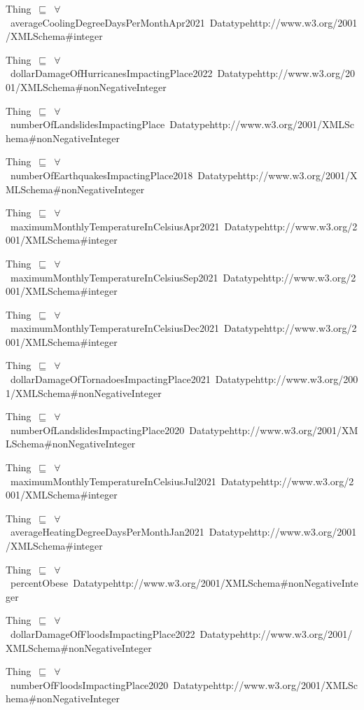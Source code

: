 \documentclass{article}
\begin{document}
Thing~\ensuremath{\sqsubseteq}~\ensuremath{\forall}~averageCoolingDegreeDaysPerMonthApr2021~Datatypehttp://www.w3.org/2001/XMLSchema#integer~

Thing~\ensuremath{\sqsubseteq}~\ensuremath{\forall}~dollarDamageOfHurricanesImpactingPlace2022~Datatypehttp://www.w3.org/2001/XMLSchema#nonNegativeInteger~

Thing~\ensuremath{\sqsubseteq}~\ensuremath{\forall}~numberOfLandslidesImpactingPlace~Datatypehttp://www.w3.org/2001/XMLSchema#nonNegativeInteger~

Thing~\ensuremath{\sqsubseteq}~\ensuremath{\forall}~numberOfEarthquakesImpactingPlace2018~Datatypehttp://www.w3.org/2001/XMLSchema#nonNegativeInteger~

Thing~\ensuremath{\sqsubseteq}~\ensuremath{\forall}~maximumMonthlyTemperatureInCelsiusApr2021~Datatypehttp://www.w3.org/2001/XMLSchema#integer~

Thing~\ensuremath{\sqsubseteq}~\ensuremath{\forall}~maximumMonthlyTemperatureInCelsiusSep2021~Datatypehttp://www.w3.org/2001/XMLSchema#integer~

Thing~\ensuremath{\sqsubseteq}~\ensuremath{\forall}~maximumMonthlyTemperatureInCelsiusDec2021~Datatypehttp://www.w3.org/2001/XMLSchema#integer~

Thing~\ensuremath{\sqsubseteq}~\ensuremath{\forall}~dollarDamageOfTornadoesImpactingPlace2021~Datatypehttp://www.w3.org/2001/XMLSchema#nonNegativeInteger~

Thing~\ensuremath{\sqsubseteq}~\ensuremath{\forall}~numberOfLandslidesImpactingPlace2020~Datatypehttp://www.w3.org/2001/XMLSchema#nonNegativeInteger~

Thing~\ensuremath{\sqsubseteq}~\ensuremath{\forall}~maximumMonthlyTemperatureInCelsiusJul2021~Datatypehttp://www.w3.org/2001/XMLSchema#integer~

Thing~\ensuremath{\sqsubseteq}~\ensuremath{\forall}~averageHeatingDegreeDaysPerMonthJan2021~Datatypehttp://www.w3.org/2001/XMLSchema#integer~

Thing~\ensuremath{\sqsubseteq}~\ensuremath{\forall}~percentObese~Datatypehttp://www.w3.org/2001/XMLSchema#nonNegativeInteger~

Thing~\ensuremath{\sqsubseteq}~\ensuremath{\forall}~dollarDamageOfFloodsImpactingPlace2022~Datatypehttp://www.w3.org/2001/XMLSchema#nonNegativeInteger~

Thing~\ensuremath{\sqsubseteq}~\ensuremath{\forall}~numberOfFloodsImpactingPlace2020~Datatypehttp://www.w3.org/2001/XMLSchema#nonNegativeInteger~
\end{document}
